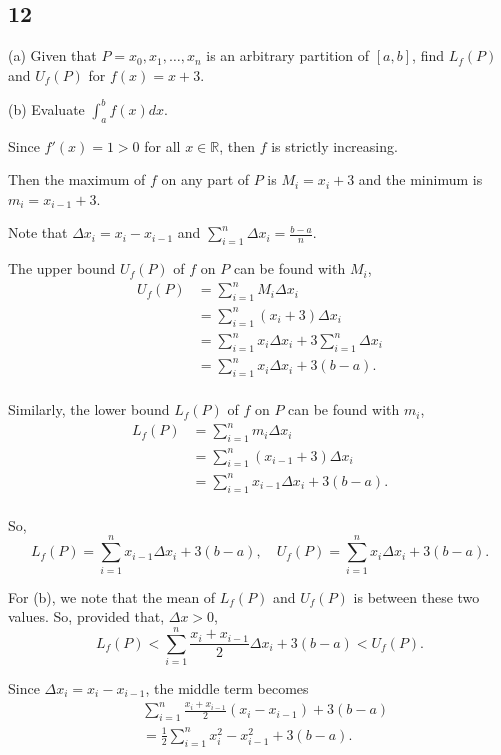 \documentclass[../hw5.tex]{subfiles}
\begin{document}
\subsection*{12}
(a) Given that $P = {x_0,x_1,\ldots,x_n}$ is an arbitrary partition of $[a,b]$, find $L_f(P)$ and $U_f(P)$ for $f(x) = x + 3$.

(b) Evaluate $\int_{a}^{b} f(x) dx$.

Since $f'(x)=1>0$ for all $x \in \mathbb{R}$, then $f$ is strictly increasing.

Then the maximum of $f$ on any part of $P$ is $M_i=x_i+3$ and the minimum is $m_i=x_{i-1}+3$.

Note that $\Delta x_i = x_i - x_{i-1}$ and $\sum_{i=1}^{n} \Delta x_i = \frac{b-a}{n}$.

The upper bound $U_f(P)$ of $f$ on $P$ can be found with $M_i$,
\begin{align*}
    U_f(P) &= \sum_{i=1}^{n} M_i \Delta x_i \\
    &= \sum_{i=1}^{n} \left( x_i+3 \right) \Delta x_i \\
    &= \sum_{i=1}^{n} x_i \Delta x_i + 3\sum_{i=1}^{n} \Delta x_i \\
    &= \sum_{i=1}^{n} x_i \Delta x_i + 3(b-a). \\
\end{align*}

Similarly, the lower bound $L_f(P)$ of $f$ on $P$ can be found with $m_i$,
\begin{align*}
    L_f(P) &= \sum_{i=1}^{n} m_i \Delta x_i \\
    &= \sum_{i=1}^{n} \left( x_{i-1}+3 \right) \Delta x_i \\
    &= \sum_{i=1}^{n} x_{i-1} \Delta x_i + 3(b-a). \\
\end{align*}

So, \[L_f(P)=\sum_{i=1}^{n} x_{i-1} \Delta x_i + 3(b-a), \quad U_f(P)=\sum_{i=1}^{n} x_i \Delta x_i + 3(b-a).\]

For (b), we note that the mean of $L_f(P)$ and $U_f(P)$ is between these two values. So, provided that, $\Delta x >0$, 
\[L_f(P)< \sum_{i=1}^{n} \frac{x_i+x_{i-1}}{2} \Delta x_i + 3(b-a) <U_f(P).\]

Since $\Delta x_i = x_i - x_{i-1}$, the middle term becomes
\begin{align*}
    & \sum_{i=1}^{n} \frac{x_i+x_{i-1}}{2} (x_i-x_{i-1}) + 3(b-a) \\
    &= \frac{1}{2} \sum_{i=1}^{n} x_i^2-x_{i-1}^2+3(b-a).
\end{align*}
\end{document}
